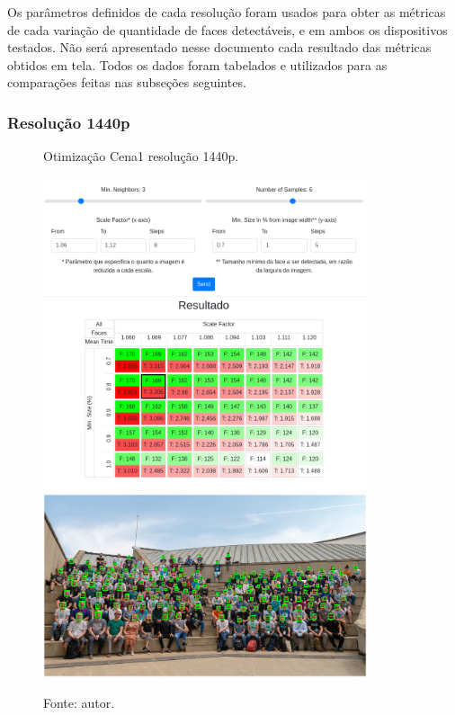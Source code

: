 Os parâmetros definidos de cada resolução foram usados para obter as métricas de cada variação de quantidade de faces detectáveis, e em ambos os dispositivos testados. Não será apresentado nesse documento cada resultado das métricas obtidos em tela. Todos os dados foram tabelados e utilizados para as comparações feitas nas subseções seguintes.


\subsubsection{Resolução 1440p} \label{sssec:resolution1}

\begin{figure}[H]
    \centering
    \caption[Otimização Cena1 resolução 1440p.]{Otimização Cena1 resolução 1440p.}
    \includegraphics[width=0.85\textwidth]{Cap4_Experimentos_Realizados/Figures/cena1_param_1440p_matriz.jpg}
    \includegraphics[width=0.85\textwidth]{Cap4_Experimentos_Realizados/Figures/cena1_param_1440p_faces.jpg}
    \caption*{Fonte: autor.}
    \label{fig:otimizacaoCena1_1440p}
\end{figure}

